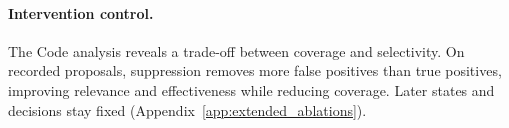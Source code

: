 \paragraph{Intervention control.}
The Code analysis reveals a trade-off between coverage and selectivity.
On recorded proposals, suppression removes more false positives than true positives, improving relevance and effectiveness while reducing coverage.
Later states and decisions stay fixed (Appendix~\ref{app:extended_ablations}).
